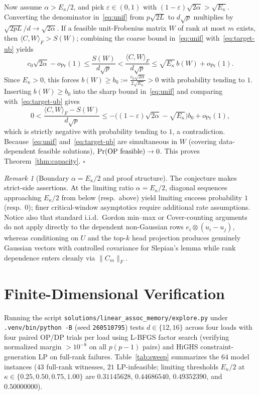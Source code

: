 \documentclass[11pt]{article}
\theoremstyle{plain}
\theoremstyle{definition}
\theoremstyle{remark}
\newtheorem{remark}{Remark}
\begin{document}
Now assume $\alpha > E_\kappa / 2$, and pick $\varepsilon \in (0, 1)$ with $(1 - \varepsilon)\sqrt{2\alpha} > \sqrt{E_\kappa}$. Converting the denominator in~\eqref{eq:unif} from $p\sqrt{2L}$ to $d\sqrt{p}$ multiplies by $\sqrt{2pL}/d \to \sqrt{2\alpha}$. If a feasible unit-Frobenius matrix $W$ of rank at most $m$ exists, then $\langle C, W \rangle_F > S(W)$; combining the coarse bound in~\eqref{eq:unif} with~\eqref{eq:target-ub} yields
\[
c_0 \sqrt{2\alpha} - o_{\Pr}(1) \le \frac{S(W)}{d\sqrt{p}} < \frac{\langle C, W \rangle_F}{d\sqrt{p}} \le \sqrt{E_\kappa}\, b(W) + o_{\Pr}(1).
\]
Since $E_\kappa > 0$, this forces $b(W) \ge b_0 := \frac{c_0 \sqrt{2\alpha}}{2\sqrt{E_\kappa}} > 0$ with probability tending to $1$. Inserting $b(W) \ge b_0$ into the sharp bound in~\eqref{eq:unif} and comparing with~\eqref{eq:target-ub} gives
\[
0 < \frac{\langle C, W \rangle_F - S(W)}{d\sqrt{p}}
\le -\bigl((1 - \varepsilon)\sqrt{2\alpha} - \sqrt{E_\kappa}\bigr) b_0 + o_{\Pr}(1),
\]
which is strictly negative with probability tending to $1$, a contradiction. Because~\eqref{eq:unif} and~\eqref{eq:target-ub} are simultaneous in $W$ (covering data-dependent feasible solutions), $\Pr(\text{\textup{OP} feasible}) \to 0$. This proves Theorem~\ref{thm:capacity}. \hfill$\square$

\begin{remark}[Boundary $\alpha = E_\kappa / 2$ and proof structure]
The conjecture makes strict-side assertions. At the limiting ratio $\alpha = E_\kappa / 2$, diagonal sequences approaching $E_\kappa / 2$ from below (resp.\ above) yield limiting success probability $1$ (resp.\ $0$); finer critical-window asymptotics require additional rate assumptions. Notice also that standard i.i.d.\ Gordon min--max or Cover-counting arguments do not apply directly to the dependent non-Gaussian rows $e_i \otimes (u_i - u_j)$, whereas conditioning on $U$ and the top-$k$ head projection produces genuinely Gaussian vectors with controlled covariance for Slepian's lemma while rank dependence enters cleanly via $\|C_m\|_F$.
\end{remark}

\section{Finite-Dimensional Verification}

Running the script \texttt{solutions/linear\_assoc\_memory/explore.py} under \texttt{.venv/bin/python -B} (seed \texttt{260510795}) tests $d \in \{12, 16\}$ across four loads with four paired \textup{OP}/\textup{DP} trials per load using L-BFGS factor search (verifying normalized margin $> 10^{-8}$ on all $p(p-1)$ pairs) and HiGHS constraint-generation LP on full-rank failures. Table~\ref{tab:sweep} summarizes the 64 model instances ($43$ full-rank witnesses, $21$ LP-infeasible; limiting thresholds $E_\kappa / 2$ at $\kappa \in \{0.25, 0.50, 0.75, 1.00\}$ are $0.31145628$, $0.44686540$, $0.49352390$, and $0.50000000$).
\end{document}
